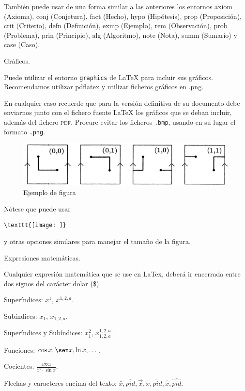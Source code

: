 \documentclass{pid}
\begin{document}
También puede usar de una forma similar a las anteriores los entornos  axiom (Axioma), conj (Conjetura), fact (Hecho), hypo (Hipótesis),  prop (Proposición), crit (Criterio), defn (Definición), exmp (Ejemplo), rem (Observación), prob (Problema), prin (Principio), alg (Algoritmo), note (Nota), summ (Sumario) y case (Caso).

\noindent Gráficos.

Puede utilizar el entorno \texttt{graphics} de \LaTeX{} para incluir sus gráficos. Recomendamos utilizar pdflatex y utilizar ficheros gráficos en \url{.png}.

En cualquier caso recuerde que para la versión definitiva de su documento debe enviarnos
junto con el fichero fuente \LaTeX{} los gráficos que se deban incluir, además del fichero \textsc{pdf}. Procure evitar los ficheros \texttt{.bmp}, usando en su lugar el formato  \texttt{.png}.



\begin{figure}[b]
\begin{center}
\includegraphics[width=0.9\columnwidth]{JRPFposicionescilindro00}
\end{center}
\caption{Ejemplo de figura}%
\label{fig0}%
\end{figure}

Nótese que puede usar
\begin{verbatim}
\texttt{[image: ]}
\end{verbatim} y otras opciones similares para manejar el tamaño de la figura.

\noindent Expresiones matemáticas.

Cualquier expresión matemática que se use en LaTex, deberá ir encerrada entre dos signos del carácter dolar (\$).

Superíndices: $x^1$, $x^{1,2,a}$.

Subíndices: $x_1$, $x_{1,2,a}$.

Superíndices y Subíndices: $x_1^2$, $x_{1,2,a}^{1,2,a}$.

Funciones: $\cos x, \sen x, \ln x, \dots$.

Cocientes: $\frac{4234}{x^2\cdot \sin x}$.

Flechas y caracteres encima del texto: $\bar{x}, \overline{pid}, \vec{x}, \tilde{x}, \widetilde{pid}, \hat{x}, \widehat{pid}$.
\end{document}

